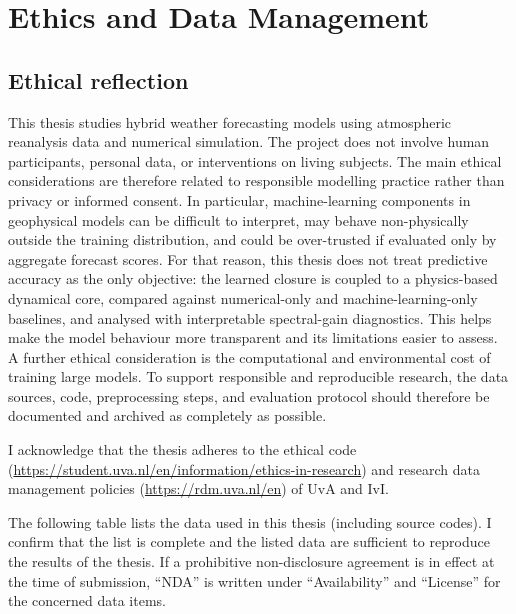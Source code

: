 \chapter{Ethics and Data Management}
\label{edm}

\section{Ethical reflection}

This thesis studies hybrid weather forecasting models using atmospheric reanalysis data
and numerical simulation. The project does not involve human participants, personal
data, or interventions on living subjects. The main ethical considerations are therefore
related to responsible modelling practice rather than privacy or informed consent. In
particular, machine-learning components in geophysical models can be difficult to
interpret, may behave non-physically outside the training distribution, and could be
over-trusted if evaluated only by aggregate forecast scores. For that reason, this thesis
does not treat predictive accuracy as the only objective: the learned closure is coupled
to a physics-based dynamical core, compared against numerical-only and machine-learning-only
baselines, and analysed with interpretable spectral-gain diagnostics. This helps make the
model behaviour more transparent and its limitations easier to assess. A further ethical
consideration is the computational and environmental cost of training large models. To
support responsible and reproducible research, the data sources, code, preprocessing
steps, and evaluation protocol should therefore be documented and archived as completely
as possible.

I acknowledge that the thesis adheres to the ethical code
(\url{https://student.uva.nl/en/information/ethics-in-research})
and research data management policies
(\url{https://rdm.uva.nl/en})
of UvA and IvI.

The following table lists the data used in this thesis (including source codes). I confirm
that the list is complete and the listed data are sufficient to reproduce the results of the
thesis. If a prohibitive non-disclosure agreement is in effect at the time of submission,
``NDA'' is written under ``Availability'' and ``License'' for the concerned data items.

